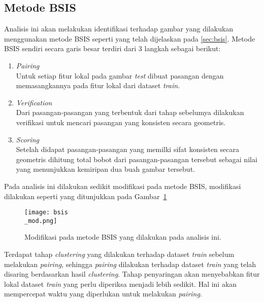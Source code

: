 \subsection{Metode BSIS}
Analisis ini akan melakukan identifikasi terhadap gambar yang dilakukan menggunakan metode BSIS seperti yang telah dijelaskan pada \ref{sec:bsis}. Metode BSIS sendiri secara garis besar terdiri dari 3 langkah sebagai berikut:
\begin{enumerate}
	\item \textit{Pairing} \\
	Untuk setiap fitur lokal pada gambar \textit{test} dibuat pasangan dengan memasangkannya pada fitur lokal dari dataset \textit{train}.
	\item \textit{Verification} \\
	Dari pasangan-pasangan yang terbentuk dari tahap sebelumya dilakukan verifikasi untuk mencari pasangan yang konsisten secara geometris.
	\item \textit{Scoring} \\
	Setelah didapat pasangan-pasangan yang memilki sifat konsisten secara geometris dihitung total bobot dari pasangan-pasangan tersebut sebagai nilai yang menunjukkan kemiripan dua buah gambar tersebut.
\end{enumerate}
Pada analisis ini dilakukan sedikit modifikasi pada metode BSIS, modifikasi dilakukan seperti yang ditunjukkan pada Gambar~\ref{fig:bsis_mod}
\begin{figure}[H]
	\centering
	\texttt{[image: bsis\\\_mod.png]}
	\caption{Modifikasi pada metode BSIS yang dilakukan pada analisis ini.}
	\label{fig:bsis_mod}
\end{figure}

Terdapat tahap \textit{clustering} yang dilakukan terhadap dataset \textit{train} sebelum melakukan \textit{pairing}, sehingga \textit{pairing} dilakukan terhadap dataset \textit{train} yang telah disaring berdasarkan hasil \textit{clustering}. Tahap penyaringan akan menyebabkan fitur lokal dataset \textit{train} yang perlu diperiksa menjadi lebih sedikit. Hal ini akan mempercepat waktu yang diperlukan untuk melakukan \textit{pairing}.


